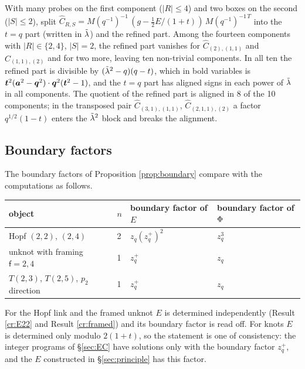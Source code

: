 \begin{result}\label{cr:hopfC}
With many probes on the first component ($|R| \le 4$) and two boxes on the second ($|S| \le 2$), split $\hat C_{R,S} = M(q^{-1})^{-1}\,(g - \tfrac12E/(1+t))\,M(q^{-1})^{-1\,T}$ into the $t = q$ part (written in $\tilde\lambda$) and the refined part. Among the fourteen components with $|R| \in \{2,4\}$, $|S| = 2$, the refined part vanishes for $\hat C_{(2),(1,1)}$ and $\hat C_{(1,1),(2)}$ and for two more, leaving ten non-trivial components. In all ten the refined part is divisible by $(\tilde\lambda^2 - q)(q - t)$, which in bold variables is $\bm{t}^2(\bm{a}^2 - \bm{q}^2)\cdot\bm{q}^2(\bm{t}^2 - 1)$, and the $t = q$ part has aligned signs in each power of $\tilde\lambda$ in all components. The quotient of the refined part is aligned in 8 of the 10 components; in the transposed pair $\hat C_{(3,1),(1,1)}$, $\hat C_{(2,1,1),(2)}$ a factor $q^{1/2}(1-t)$ enters the $\tilde\lambda^2$ block and breaks the alignment.
\end{result}

\subsection{Boundary factors}
\begin{result}\label{cr:boundary}
The boundary factors of Proposition \ref{prop:boundary} compare with the computations as follows.
\begin{center}
\small
\begin{tabular}{llll}
\toprule
object & $n$ & boundary factor of $E$ & boundary factor of $\Phi$ \\
\midrule
Hopf $(2,2)$, $(2,4)$ & 2 & $z_q(z_q^+)^2$ & $z_q^3$ \\
unknot with framing $\mathsf f = 2, 4$ & 1 & $z_q^+$ & $z_q$ \\
$T(2,3)$, $T(2,5)$, $p_2$ direction & 1 & $z_q^+$ & $z_q$ \\
\bottomrule
\end{tabular}
\end{center}
For the Hopf link and the framed unknot $E$ is determined independently (Result \ref{cr:E22} and Result \ref{cr:framed}) and its boundary factor is read off. For knots $E$ is determined only modulo $2(1+t)$, so the statement is one of consistency: the integer programs of \S\ref{sec:EC} have solutions only with the boundary factor $z_q^+$, and the $E$ constructed in \S\ref{sec:principle} has this factor.
\end{result}
